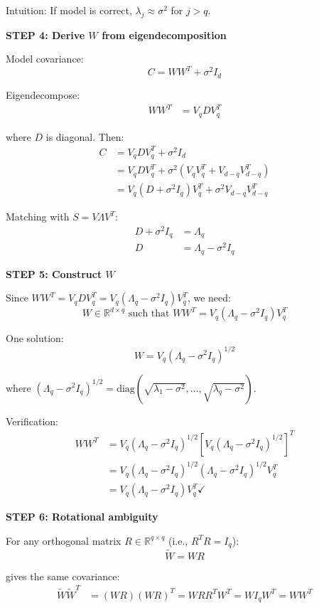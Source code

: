 \documentclass[12pt]{article}
\begin{document}
\begin{solution}
Intuition: If model is correct, $\lambda_j \approx \sigma^2$ for $j > q$.

\textbf{STEP 4: Derive $W$ from eigendecomposition}

Model covariance:
\[
C = WW^T + \sigma^2 I_d
\]

Eigendecompose:
\begin{align*}
WW^T &= V_q D V_q^T
\end{align*}

where $D$ is diagonal. Then:
\begin{align*}
C &= V_q D V_q^T + \sigma^2 I_d \\
&= V_q D V_q^T + \sigma^2(V_q V_q^T + V_{d-q}V_{d-q}^T) \\
&= V_q(D + \sigma^2 I_q)V_q^T + \sigma^2 V_{d-q}V_{d-q}^T
\end{align*}

Matching with $S = V\Lambda V^T$:
\begin{align*}
D + \sigma^2 I_q &= \Lambda_q \\
D &= \Lambda_q - \sigma^2 I_q
\end{align*}

\textbf{STEP 5: Construct $W$}

Since $WW^T = V_q D V_q^T = V_q(\Lambda_q - \sigma^2 I_q)V_q^T$, we need:
\[
W \in \mathbb{R}^{d \times q} \text{ such that } WW^T = V_q(\Lambda_q - \sigma^2 I_q)V_q^T
\]

One solution:
\[
W = V_q (\Lambda_q - \sigma^2 I_q)^{1/2}
\]

where $(\Lambda_q - \sigma^2 I_q)^{1/2} = \text{diag}(\sqrt{\lambda_1 - \sigma^2}, \ldots, \sqrt{\lambda_q - \sigma^2})$.

Verification:
\begin{align*}
WW^T &= V_q(\Lambda_q - \sigma^2 I_q)^{1/2}[V_q(\Lambda_q - \sigma^2 I_q)^{1/2}]^T \\
&= V_q(\Lambda_q - \sigma^2 I_q)^{1/2}(\Lambda_q - \sigma^2 I_q)^{1/2}V_q^T \\
&= V_q(\Lambda_q - \sigma^2 I_q)V_q^T \checkmark
\end{align*}

\textbf{STEP 6: Rotational ambiguity}

For any orthogonal matrix $R \in \mathbb{R}^{q \times q}$ (i.e., $R^TR = I_q$):
\[
\tilde{W} = WR
\]

gives the same covariance:
\begin{align*}
\tilde{W}\tilde{W}^T &= (WR)(WR)^T = WRR^TW^T = WI_qW^T = WW^T
\end{align*}


\end{solution}
\end{document}
